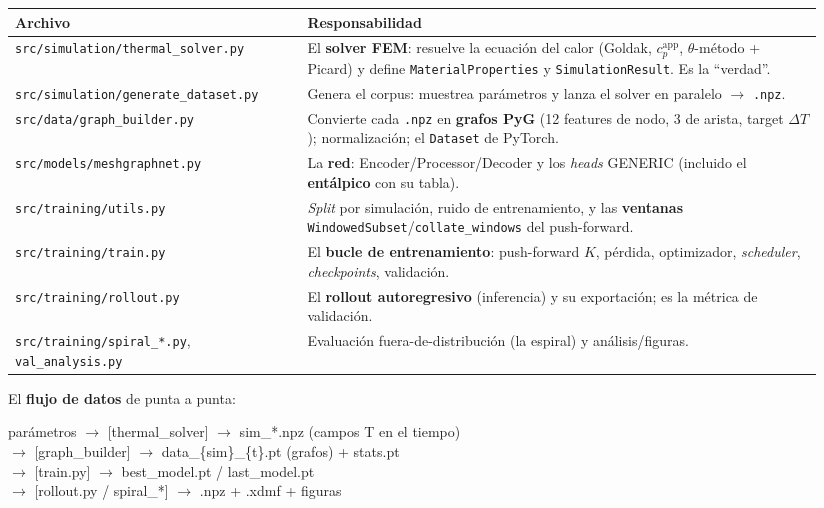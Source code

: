 \documentclass[11pt]{article}
\newcommand{\cpapp}{c_p^{\mathrm{app}}}
\theoremstyle{definition}
\theoremstyle{plain}
\begin{document}
\begin{center}\small
\begin{tabular}{@{}p{0.34\linewidth}p{0.60\linewidth}@{}}
\toprule
Archivo & Responsabilidad \\
\midrule
\texttt{src/simulation/thermal\_solver.py} & El \textbf{solver FEM}: resuelve la
ecuación del calor (Goldak, $\cpapp$, $\theta$-método + Picard) y define
\texttt{MaterialProperties} y \texttt{SimulationResult}. Es la ``verdad''. \\
\texttt{src/simulation/generate\_dataset.py} & Genera el corpus: muestrea
parámetros y lanza el solver en paralelo $\rightarrow$ \texttt{.npz}. \\
\texttt{src/data/graph\_builder.py} & Convierte cada \texttt{.npz} en
\textbf{grafos PyG} (12 features de nodo, 3 de arista, target $\Delta T$);
normalización; el \texttt{Dataset} de PyTorch. \\
\texttt{src/models/meshgraphnet.py} & La \textbf{red}: Encoder/Processor/Decoder y
los \emph{heads} GENERIC (incluido el \textbf{entálpico} con su tabla). \\
\texttt{src/training/utils.py} & \emph{Split} por simulación, ruido de
entrenamiento, y las \textbf{ventanas} \texttt{WindowedSubset}/\texttt{collate\_windows}
del push-forward. \\
\texttt{src/training/train.py} & El \textbf{bucle de entrenamiento}: push-forward
$K$, pérdida, optimizador, \emph{scheduler}, \emph{checkpoints}, validación. \\
\texttt{src/training/rollout.py} & El \textbf{rollout autoregresivo} (inferencia)
y su exportación; es la métrica de validación. \\
\texttt{src/training/spiral\_*.py}, \texttt{val\_analysis.py} & Evaluación
fuera-de-distribución (la espiral) y análisis/figuras. \\
\bottomrule
\end{tabular}
\end{center}

El \textbf{flujo de datos} de punta a punta:
\begin{center}\small\ttfamily
parámetros $\rightarrow$ [thermal\_solver] $\rightarrow$ sim\_*.npz (campos T en el tiempo)\\
$\rightarrow$ [graph\_builder] $\rightarrow$ data\_\{sim\}\_\{t\}.pt (grafos) + stats.pt\\
$\rightarrow$ [train.py] $\rightarrow$ best\_model.pt / last\_model.pt\\
$\rightarrow$ [rollout.py / spiral\_*] $\rightarrow$ .npz + .xdmf + figuras
\end{center}
\end{document}
